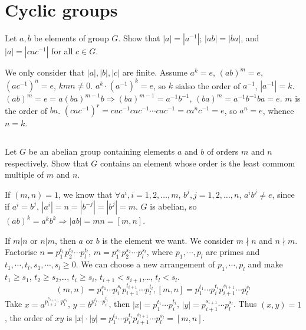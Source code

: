 \section{Cyclic groups}
\begin{ex}
    Let $a,b$ be elements of group $G$. Show that $\left| a \right| =\left| a^{-1} \right| $; $\left| ab \right| =\left| ba \right| $, and $\left| a \right| =\left| cac^{-1} \right| $ for all $c\in G$.
\end{ex}

\begin{answer}
    We only consider that $\left| a \right| , \left| b \right| , \left| c \right| $ are finite. Assume $a^{k}=e$, $(ab)^{m}=e$, $(ac^{-1})^{n}=e$, $kmn\neq 0$. $a^{k}\cdot(a^{-1})^{k}=e$, so $k$ sialso the order of $a^{-1}$, $\left| a^{-1} \right| =k$. $(ab)^{m}=e=a(ba)^{m-1}b\Rightarrow (ba)^{m-1}=a^{-1}b^{-1}$, $(ba)^{m}=a^{-1}b^{-1}ba=e$. $m$ is the order of $ba$. $(cac^{-1})^{r}=cac^{-1}cac^{-1}\cdots cac^{-1}=ca^{n}c^{-1}=e$, so $a^{n}=e$, whence $n=k$.
\end{answer}

$$ $$

\begin{ex}
    Let $G$ be an abelian group containing elements $a$ and $b$ of orders $m$ and $n$ respectively. Show that $G$ contains an element whose order is the least commom multiple of $m$ and $n$.
\end{ex}

\begin{answer}
    If $(m,n)=1$, we know that $\forall a^{i}, i=1,2,\dots, m$, $b^{j}, j=1, 2, \dots, n$, $a^{i}b^{j}\neq e$, since if $a^{i}=b^{j}$, $\left| a^{i} \right| =n=\left| b^{-j} \right| =\left| b^{j} \right| =m$. $G$ is abelian, so $(ab)^{k}=a^{k}b^{k}\Rightarrow \left| ab \right|=mn=\left[ m,n\right]$.

    If $m|n$ or $n|m$, then $a$ or $b$ is the element we want. We consider $m\nmid n$ and $n\nmid m$. Factorise $n=p_{1}^{t_{1}}p_{2}^{t_{2}}\cdots p_{l}^{t_{l}}$, $m=p_{1}^{s_{1}}p_{2}^{s_{2}}\cdots p_{l}^{s_{l}}$, where $p_{1},\cdots,p_{l}$ are primes and $t_{1},\cdots,t_{l}, s_{1},\cdots, s_{l}\geq 0$. We can choose a new arrangement of $p_{1},\cdots,p_{l}$ and make $t_{1}\geq s_{1}$, $t_{2}\geq s_{2}$,\dots, $t_{i}\geq s_{i}$, $t_{i+1}<s_{i+1}$,\dots, $t_{l}<s_{l}$.\[(m,n)=p_{1}^{s_{1}}\cdots p_{i}^{s_{i}}p_{i+1}^{t_{i+1}}\cdots p_{l}^{t_{l}}, \left[m,n\right]=p_{1}^{t_{1}}\cdots p_{i}^{t_{i}}p_{i+1}^{s_{i+1}}\cdots p_{l}^{s_{l}}\] Take $x=a^{{p_{i+1}^{s_{i+1}}}\cdots p_{l}^{s_{l}}}$, $y=b^{{p_{1}^{t_{1}}}\cdots p_{i}^{t_{i}}}$, then $\left| x \right| ={p_{1}^{t_{1}}}\cdots p_{i}^{t_{i}}$, $\left| y \right| =p_{i+1}^{s_{i+1}}\cdots p_{l}^{s_{l}}$. Thus $(x,y)=1$, the order of $xy$ is $\left| x \right| \cdot\left| y \right| =p_{1}^{t_{1}}\cdots p_{i}^{t_{i}}p_{i+1}^{s_{i+1}}\cdots p_{l}^{s_{l}}=\left[m,n\right]$.
\end{answer}

